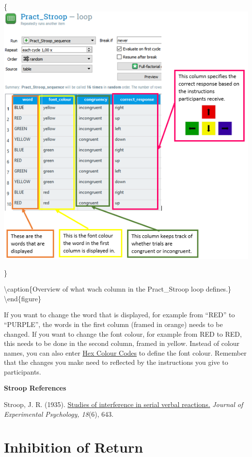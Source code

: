\documentclass[
]{book}
\begin{document}
\{\centering \includegraphics[width=0.99\linewidth]{images/changestroop/01loop}

\}

\textbackslash caption\{Overview of what wach column in the Pract\_Stroop loop defines.\}\label{fig:Figure3-17}
\textbackslash end\{figure\}

If you want to change the word that is displayed, for example from ``RED'' to ``PURPLE'', the words in the first column (framed in orange) needs to be changed. If you want to change the font colour, for example from {RED} to {RED}, this needs to be done in the second column, framed in yellow. Instead of colour names, you can also enter \href{https://htmlcolorcodes.com/}{Hex Colour Codes} to define the font colour. Remember that the changes you make need to reflected by the instructions you give to participants.

\textbf{Stroop References}

Stroop, J. R. (1935). \href{https://pure.mpg.de/rest/items/item_2389918/component/file_2389917/content}{Studies of interference in serial verbal reactions.} \emph{Journal of Experimental Psychology, 18}(6), 643.

\hypertarget{inhibition-of-return}{%
\section{Inhibition of Return}\label{inhibition-of-return}}
\end{document}
